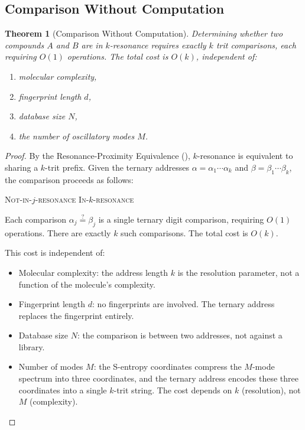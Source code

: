\documentclass[11pt,twocolumn,a4paper]{article}
\newtheorem{theorem}{Theorem}[section]
\theoremstyle{definition}
\theoremstyle{remark}
\begin{document}
\subsection{Comparison Without Computation}\label{sec:comp-without-comp}

\begin{theorem}[Comparison Without Computation]\label{thm:no-computation}
Determining whether two compounds $A$ and $B$ are in $k$-resonance requires exactly $k$ trit comparisons, each requiring $O(1)$ operations. The total cost is $O(k)$, independent of:
\begin{enumerate}[label=(\roman*)]
  \item molecular complexity,
  \item fingerprint length $d$,
  \item database size $N$,
  \item the number of oscillatory modes $M$.
\end{enumerate}
\end{theorem}

\begin{proof}
By the Resonance-Proximity Equivalence (), $k$-resonance is equivalent to sharing a $k$-trit prefix. Given the ternary addresses $\alpha = \alpha_1 \cdots \alpha_k$ and $\beta = \beta_1 \cdots \beta_k$, the comparison proceeds as follows:

\begin{algorithmic}
    \RETURN \textsc{Not-in-$j$-resonance}
  \ENDIF
\ENDFOR
\RETURN \textsc{In-$k$-resonance}
\end{algorithmic}

Each comparison $\alpha_j \stackrel{?}{=} \beta_j$ is a single ternary digit comparison, requiring $O(1)$ operations. There are exactly $k$ such comparisons. The total cost is $O(k)$.

This cost is independent of:
\begin{itemize}
  \item Molecular complexity: the address length $k$ is the resolution parameter, not a function of the molecule's complexity.
  \item Fingerprint length $d$: no fingerprints are involved. The ternary address replaces the fingerprint entirely.
  \item Database size $N$: the comparison is between two addresses, not against a library.
  \item Number of modes $M$: the S-entropy coordinates compress the $M$-mode spectrum into three coordinates, and the ternary address encodes these three coordinates into a single $k$-trit string. The cost depends on $k$ (resolution), not $M$ (complexity).
\end{itemize}
\end{proof}
\end{document}

